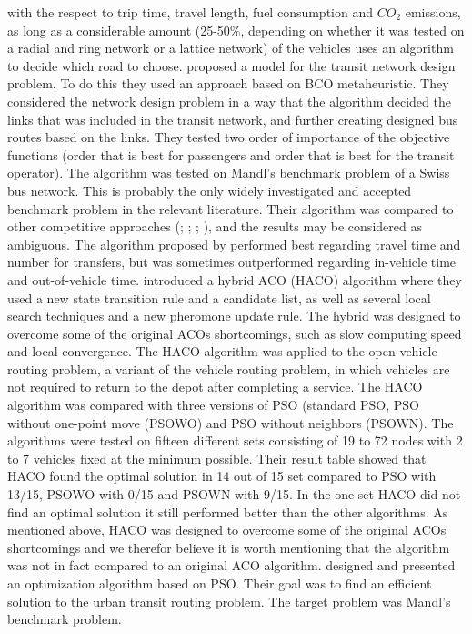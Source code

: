 with the respect to trip time, travel length, fuel consumption and $CO_2$ emissions, as long as a considerable amount (25-50\%, depending on whether it was tested on a radial and ring network or a lattice network) of the vehicles uses an algorithm to decide which road to choose. \citet{nikolic14} proposed a model for the transit network design problem. To do this they used an approach based on BCO metaheuristic. They considered the network design problem in a way that the algorithm decided the links that was included in the transit network, and further creating designed bus routes based on the links. They tested two order of importance of the objective functions (order that is best for passengers and order that is best for the transit operator). The algorithm was tested on Mandl's benchmark problem of a Swiss bus network\citep{mandl80}. This is probably the only widely investigated and accepted benchmark problem in the relevant literature\citep{kechagiopoulos14}. Their algorithm was compared to other competitive approaches (\citet{mandl80}; \citet{shih94}; \citet{baaj95}; \citet{bagloee11}), and the results may be considered as ambiguous. The algorithm proposed by \citet{nikolic14} performed best regarding travel time and number for transfers, but was sometimes outperformed regarding in-vehicle time and out-of-vehicle time. \citet{sedighpour14} introduced a hybrid ACO (HACO) algorithm where they used a new state transition rule and a candidate list, as well as several local search techniques and a new pheromone update rule. The hybrid was designed to overcome some of the original ACOs shortcomings, such as slow computing speed and local convergence. The HACO algorithm was applied to the open vehicle routing problem, a variant of the vehicle routing problem, in which vehicles are not required to return to the depot after completing a service. The HACO algorithm was compared with three versions of PSO (standard PSO, PSO without one-point move (PSOWO) and PSO without neighbors (PSOWN). The algorithms were tested on fifteen different sets consisting of 19 to 72 nodes with 2 to 7 vehicles fixed at the minimum possible. Their result table showed that HACO found the optimal solution in 14 out of 15 set compared to PSO with 13/15, PSOWO with 0/15 and PSOWN with 9/15. In the one set HACO did not find an optimal solution it still performed better than the other algorithms. As mentioned above, HACO was designed to overcome some of the original ACOs shortcomings and we therefor believe it is worth mentioning that the algorithm was not in fact compared to an original ACO algorithm. \citet{kechagiopoulos14} designed and presented an optimization algorithm based on PSO. Their goal was to find an efficient solution to the urban transit routing problem. The target problem was Mandl's benchmark problem.




